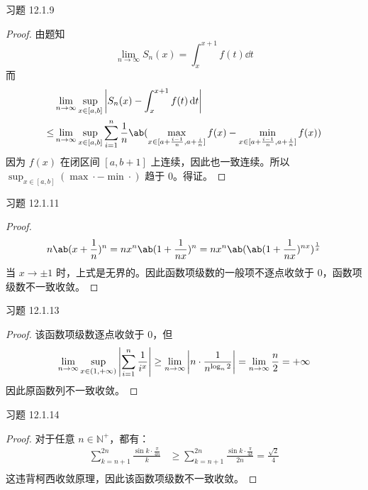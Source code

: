 \begin{problem}
    习题 12.1.9
    \begin{proof}
        由题知
        $$
        \lim_{n \to \infty} S_n(x) = \int_{x}^{x + 1} f(t) \dd{t}
        $$
        而
        $$
        \begin{aligned}
            & \lim_{n \to \infty} \sup_{x \in [a, b]} \abs{S_n(x) - \int_{x}^{x + 1} f(t) \dd{t}} \\
            \le & \lim_{n \to \infty} \sup_{x \in [a, b]} \sum_{i = 1}^{n} \frac{1}{n} \ab(\max_{x \in [a + \frac{i - 1}{n}, a + \frac{i}{n}]} f(x) - \min_{x \in [a + \frac{i - 1}{n}, a + \frac{i}{n}]} f(x))
        \end{aligned}
        $$
        因为 $f(x)$ 在闭区间 $[a, b + 1]$ 上连续，因此也一致连续。所以 $\sup_{x \in [a, b]} (\max \cdot - \min \cdot )$ 趋于 $0$。得证。
    \end{proof}
\end{problem}

\begin{problem}
    习题 12.1.11
    \begin{proof}
        $$
        n \ab(x + \frac{1}{n})^{n} = n x^{n} \ab(1 + \frac{1}{n x})^{n} = n x^{n} \ab(\ab(1 + \frac{1}{n x})^{n x})^{\frac{1}{x}}
        $$
        当 $x \to \pm 1$ 时，上式是无界的。因此函数项级数的一般项不逐点收敛于 $0$，函数项级数不一致收敛。
    \end{proof}
\end{problem}

\begin{problem}
    习题 12.1.13
    \begin{proof}
        该函数项级数逐点收敛于 $0$，但
        $$
        \lim_{n \to \infty} \sup_{x \in (1, +\infty)} \abs{\sum_{i = 1}^{n} \frac{1}{i^{x}}} \ge \lim_{n \to \infty} \abs{n \cdot \frac{1}{n^{\log_n 2}}} = \lim_{n \to \infty} \frac{n}{2} = +\infty
        $$
        因此原函数列不一致收敛。
    \end{proof}
\end{problem}

\begin{problem}
    习题 12.1.14
    \begin{proof}
        对于任意 $n \in \mathbb{N}^{+}$，都有：
        $$
        \begin{aligned}
            \sum_{k = n + 1}^{2n} \frac{\sin k \cdot \frac{\pi}{4 n}}{k} & \ge \sum_{k = n + 1}^{2n} \frac{\sin k \cdot \frac{\pi}{4 k}}{2 n} = \frac{\sqrt{2}}{4} \\
        \end{aligned}
        $$
        这违背柯西收敛原理，因此该函数项级数不一致收敛。
    \end{proof}
\end{problem}

